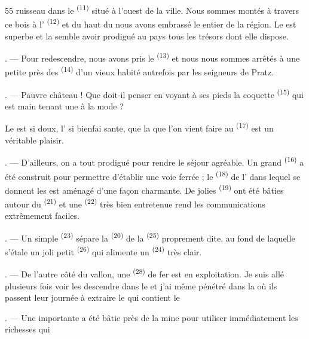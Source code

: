 \begin{VUpage}[57]{55}
\VUcontinue
ruisseau dans le  \textsuperscript{(11)} situé à l'ouest de\nl
la ville. Nous sommes montés à travers ce bois à\nl
l' \textsuperscript{(12)} et du haut du\nl
{} nous avons embrassé le \nl
entier de la région. Le  est superbe et la\nl
{} semble avoir prodigué au pays tous les\nl
trésors dont elle dispose.

. --- Pour redescendre, nous avons pris le \cc
{} \textsuperscript{(13)} et nous nous sommes arrêtés à une petite\nl
{} près des  \textsuperscript{(14)} d'un vieux \nl
{} habité autrefois par les seigneurs de Pratz.

. --- Pauvre château ! Que doit-il penser en voyant\nl
à ses pieds la coquette  \textsuperscript{(15)} qui est main\cc
tenant une  à la mode ?

\VUblancAlinea
Le  est si doux, l' si bienfai\cc
sante, que la  que l'on vient faire au \cc
{} \textsuperscript{(17)} est un véritable plaisir.

. --- D'ailleurs, on a tout prodigué pour rendre le\nl
séjour agréable. Un grand  \textsuperscript{(16)} a été construit\nl
pour permettre d'établir une voie ferrée ; le  \textsuperscript{(18)}\nl
de l' dans lequel se donnent\nl
les  est aménagé d'une façon charmante.\nl
De jolies  \textsuperscript{(19)} ont été bâties autour du  \textsuperscript{(21)}\nl
et une  \textsuperscript{(22)} très bien entretenue rend les\nl
communications extrêmement faciles.

. --- Un simple  \textsuperscript{(23)} sépare la  \textsuperscript{(20)} de la\nl
{} \textsuperscript{(25)} proprement dite, au fond de laquelle s'étale\nl
un joli petit  \textsuperscript{(26)} qui alimente un  \textsuperscript{(24)} très\nl
clair.

. --- De l'autre côté du vallon, une  \textsuperscript{(28)} de\nl
fer est en exploitation. Je suis allé plusieurs fois voir\nl
les  descendre dans le  et j'ai même\nl
pénétré dans la  où ils passent leur journée\nl
à extraire le  qui contient le 

. --- Une importante  a été bâtie près de\nl
la mine pour utiliser immédiatement les richesses qui
\parplein
\end{VUpage}

